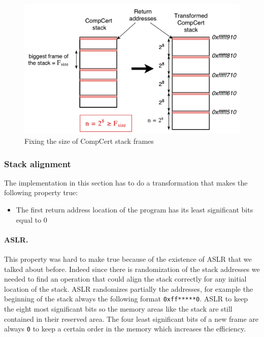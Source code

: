 \documentclass[11pt]{sdm}
\begin{document}
\begin{figure}[!ht]
\centering
\includegraphics[scale=0.6]{images/stack_transform.pdf}
\caption{Fixing the size of CompCert stack frames}
\label{stack_transform}
\end{figure}

\subsubsection{Stack alignment}
\label{ssub:Stack alignment}

The implementation in this section has to do a transformation that makes the following property true:
\begin{itemize}
	\item The first return address location of the program has its least significant bits equal to 0
\end{itemize}

\paragraph{ASLR.}
\label{par:ASLR}

This property was hard to make true because of the existence of ASLR that we talked about before. Indeed since there is randomization of the stack addresses we needed to find an operation that could align the stack correctly for any initial location of the stack. ASLR randomizes partially the addresses, for example the beginning of the stack always the following format \texttt{0xff*****0}. ASLR to keep the eight most significant bits so the memory areas like the stack are still contained in their reserved area. The four least significant bits of a new frame are always \texttt{0} to keep a certain order in the memory which increases the efficiency.
\hfill \break
\end{document}
